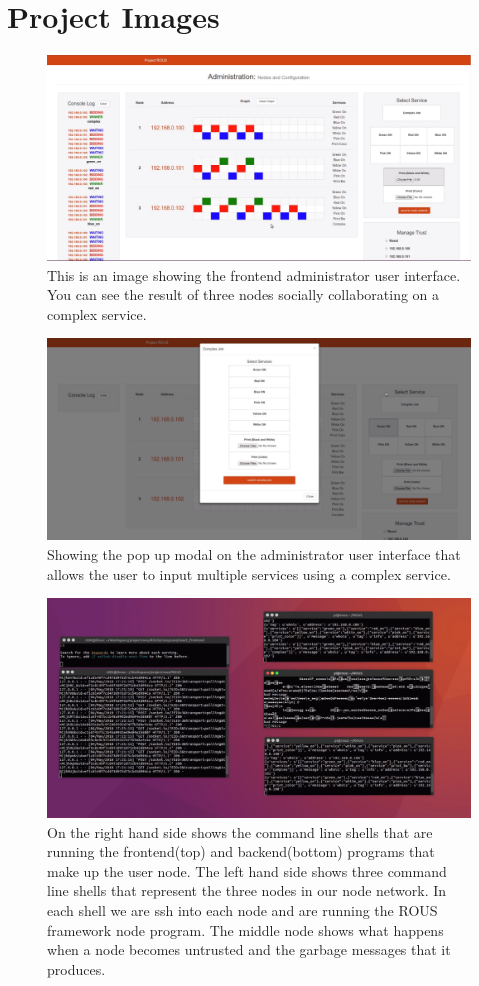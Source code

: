 \documentclass[draftclsnofoot, onecolumn, compsoc, 10pt]{IEEEtran}
\begin{document}
\section{Project Images}
\begin{figure}[!htb]
\centering
	\includegraphics[width=1.0\textwidth]{img1}
	\caption{This is an image showing the frontend administrator user interface. You can see the result of three nodes socially collaborating on a complex service.}
\end{figure}
\begin{figure}[!htb]
\centering
	\includegraphics[width=1.0\textwidth]{img2}
	\caption{Showing the pop up modal on the administrator user interface that allows the user to input multiple services using a complex service.}
\end{figure}
\begin{figure}[!htb]
\centering
	\includegraphics[width=1.0\textwidth]{img3}
	\caption{On the right hand side shows the command line shells that are running the frontend(top) and backend(bottom) programs that make up the user node. The left hand side shows three command line shells that represent the three nodes in our node network. In each shell we are ssh into each node and are running the ROUS framework node program. The middle node shows what happens when a node becomes untrusted and the garbage messages that it produces.}
\end{figure}
\end{document}
